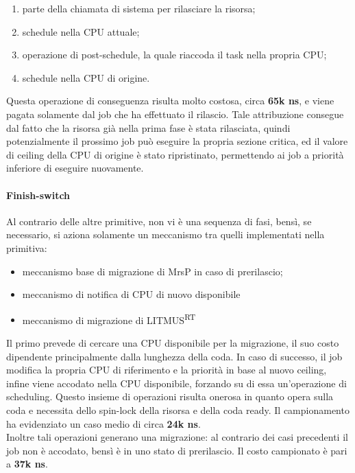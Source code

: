 \begin{enumerate}
	\item parte della chiamata di sistema per rilasciare la risorsa;
	\item schedule nella CPU attuale;
	\item operazione di post-schedule, la quale riaccoda il task nella propria CPU;
	\item schedule nella CPU di origine.
\end{enumerate}

\noindent Questa operazione di conseguenza risulta molto costosa, circa \textbf{65k ns}, e viene pagata solamente dal job che ha effettuato il rilascio. Tale attribuzione consegue dal fatto che la risorsa già nella prima fase è stata rilasciata, quindi potenzialmente il prossimo job può eseguire la propria sezione critica, ed il valore di ceiling della CPU di origine è stato ripristinato, permettendo ai job a priorità inferiore di eseguire nuovamente.\\

\paragraph{Finish-switch} Al contrario delle altre primitive, non vi è una sequenza di fasi, bensì, se necessario, si aziona solamente un meccanismo tra quelli implementati nella primitiva:

\begin{itemize}
	\item meccanismo base di migrazione di MrsP in caso di prerilascio;
	\item meccanismo di notifica di CPU di nuovo disponibile
  \item meccanismo di migrazione di LITMUS\textsuperscript{RT} 
\end{itemize}

\noindent Il primo prevede di cercare una CPU disponibile per la migrazione, il suo costo dipendente principalmente dalla lunghezza della coda. In caso di successo, il job modifica la propria CPU di riferimento e la priorità in base al nuovo ceiling, infine viene accodato nella CPU disponibile, forzando su di essa un'operazione di scheduling. Questo insieme di operazioni risulta onerosa in quanto opera sulla coda e necessita dello spin-lock della risorsa e della coda ready. Il campionamento ha evidenziato un caso medio di circa \textbf{24k ns}.\\

\noindent Inoltre tali operazioni generano una migrazione: al contrario dei casi precedenti il job non è accodato, bensì è in uno stato di prerilascio. Il costo campionato è pari a \textbf{37k ns}.\\

